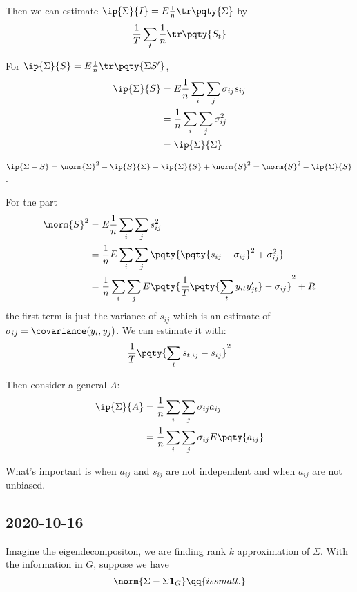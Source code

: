 Then we can estimate \(\ip{\Sigma}{I} = E \frac{1}{n} \tr\pqty{\Sigma}\) by
\begin{equation*}
    \frac{1}{T} \sum_{t} \frac{1}{n}\tr\pqty{S_{t}}
\end{equation*}

For \(\ip{\Sigma}{S} = E \frac{1}{n} \tr\pqty{\Sigma S'}\), 
\begin{align*}
    \ip{\Sigma}{S} &= E \frac{1}{n} \sum_{i}\sum_{j} \sigma_{ij}s_{ij} \\
    &=  \frac{1}{n} \sum_{i}\sum_{j} \sigma_{ij}^{2}\\
    &= \ip{\Sigma}{\Sigma}
\end{align*}

\(\ip{\Sigma - S} = \norm{\Sigma}^{2} - \ip{S}{\Sigma} - \ip{\Sigma}{S} + \norm{S}^{2} = \norm{S}^{2} - \ip{\Sigma}{S}\). 

For the part
\begin{align}
    \norm{S}^{2} &= E \frac{1}{n} \sum_{i} \sum_{j} s_{ij}^{2} \\
    &= \frac{1}{n} E \sum_{i}\sum_{j} \pqty{\pqty{s_{ij} - \sigma_{ij}}^{2} + \sigma_{ij}^{2} } \\
    &= \frac{1}{n} \sum_{i}\sum_{j}E \pqty{\frac{1}{T} \pqty{\sum_{t} y_{it}y_{jt}'} - \sigma_{ij}}^{2} + R
\end{align}
the first term is just the variance of \(s_{ij}\) which is an estimate of \(\sigma_{ij} =  \covariance(y_{i}, y_{j})\). We can estimate it with:
\begin{equation*}
    \frac{1}{T} \pqty{\sum_{t} s_{t,ij} - s_{ij}}^{2}
\end{equation*}

Then consider a general \(A\):
\begin{align*}
    \ip{\Sigma}{A} &= \frac{1}{n} \sum_{i}\sum_{j} \sigma_{ij}a_{ij} \\
    &= \frac{1}{n} \sum_{i}\sum_{j} \sigma_{ij} E\pqty{a_{ij}}
\end{align*}

What's important is when \(a_{ij}\) and \(s_{ij}\) are not independent and when \(a_{ij}\) are not unbiased.
\subsection{2020-10-16}
Imagine the eigendecompositon, we are finding rank \(k\) approximation of \(\Sigma\). With the information in \(G\), suppose we have 
\begin{equation*}
    \norm{\Sigma - \Sigma \mathbf{1}_{G}} \qq{is small.}
\end{equation*}

